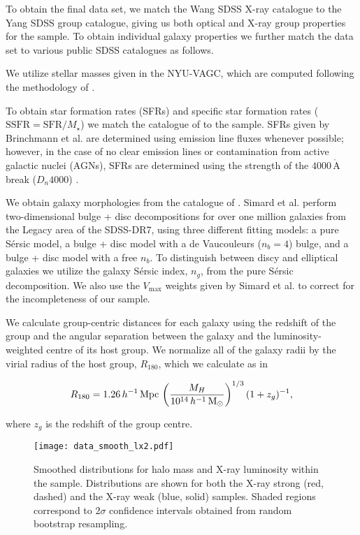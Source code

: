 To obtain the final data set, we match the Wang SDSS X-ray catalogue
to the Yang SDSS group catalogue, giving us both optical and X-ray
group properties for the sample.  To obtain individual galaxy
properties we further match the data set to various public SDSS
catalogues as follows.
\par
We utilize stellar masses given in the NYU-VAGC, which are computed
following the methodology of \citet{blanton2007}.
\par
To obtain star formation rates (SFRs) and specific star formation
rates ($\mathrm{SSFR} = \mathrm{SFR} / M_\star$) we match the
catalogue of \citet{brinchmann2004} to the sample.  SFRs given by
Brinchmann et al. are determined using emission line fluxes whenever
possible; however, in the case of no clear emission lines or
contamination from active galactic nuclei (AGNs), SFRs are determined
using the strength of the $4000\,\mathrm{\mathring{A}}$ break
($D_n4000$) \citep{brinchmann2004}.
\par
We obtain galaxy morphologies from the catalogue of
\citet{simard2011}.  Simard et al. perform two-dimensional bulge +
disc decompositions for over one million galaxies from the Legacy area
of the SDSS-DR7, using three different fitting models: a pure
S{\'e}rsic model, a bulge + disc model with a de Vaucouleurs ($n_b =
4$) bulge, and a bulge + disc model with a free $n_b$.  To distinguish
between discy and elliptical galaxies we utilize the galaxy S{\'e}rsic
index, $n_g$, from the pure S{\'e}rsic decomposition.  We also use the
$V_\mathrm{max}$ weights given by Simard et al. to correct for the
incompleteness of our sample.
\par
We calculate group-centric distances for each galaxy using the
redshift of the group and the angular separation between the galaxy
and the luminosity-weighted centre of its host group.  We normalize
all of the galaxy radii by the virial radius of the host group,
$R_{180}$, which we calculate as in \citet{yang2007}

\begin{equation}
  R_{180} =
  1.26\,h^{-1}\,\mathrm{Mpc}\,\left(\frac{M_H}{10^{14}\,h^{-1}\,\mathrm{M_{\odot}}}
  \right )^{1/3} (1 + z_g)^{-1},
\end{equation}

\noindent
where $z_g$ is the redshift of the group centre.

\begin{figure}[!tp]
  \centering
  \texttt{[image: data\_smooth\_lx2.pdf]}
  \caption{Smoothed distributions for halo mass and X-ray luminosity
    within the sample.  Distributions are shown for both the X-ray
    strong (red, dashed) and the X-ray weak (blue, solid) samples.
    Shaded regions correspond to $2\sigma$ confidence intervals
    obtained from random bootstrap resampling.}
  \label{fig:data_smooth_lx2}
\end{figure} 

